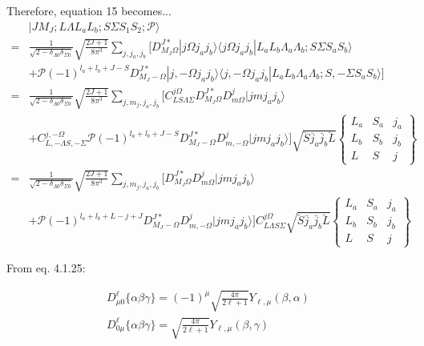 \documentclass[prl, longbibliography]{revtex4-2}
\begin{document}
Therefore, equation 15 becomes...
\begin{equation}
\begin{split}
&|J M_J; L \Lambda L_a L_b; S \Sigma  S_1 S_2; \mathcal{P} \rangle
\\
=&\frac{1}{\sqrt{2-\delta_{\Lambda 0}\delta_{\Sigma 0}}}
\sqrt{\frac{2J+1}{8\pi^3}}
\sum_{j, j_a, j_b} 
\bigg[D^{J*}_{M_J\Omega}
|j\Omega j_a j_b\rangle\langle j\Omega j_a j_b | L_a L_b \Lambda_a \Lambda_b; S\Sigma S_a S_b\rangle
\\
&+\mathcal{P}(-1)^{l_a+l_b+J-S}D^{J*}_{M_J-\Omega}
|j,-\Omega j_a j_b\rangle\langle j,-\Omega j_a j_b | L_a L_b \Lambda_a \Lambda_b; S,-\Sigma S_a S_b\rangle
\bigg]
\\
=&\frac{1}{\sqrt{2-\delta_{\Lambda 0}\delta_{\Sigma 0}}}
\sqrt{\frac{2J+1}{8\pi^3}}
\sum_{j, m_j, j_a, j_b} \bigg[
C_{L S \Lambda \Sigma}^{j \Omega}
D^{J*}_{M_J\Omega}D^j_{m \Omega}
|j m j_a j_b\rangle
\\
&+
C_{L,-\Lambda S,-\Sigma}^{j,-\Omega}
\mathcal{P}(-1)^{l_a+l_b+J-S}D^{J*}_{M_J-\Omega}
D^j_{m,-\Omega}|j m j_a j_b\rangle \bigg]
\sqrt{\breve{S}\breve{j_a}\breve{j_b}\breve{L}}
\begin{Bmatrix}
L_a & S_a & j_a\\
L_b & S_b & j_b\\
L & S & j
\end{Bmatrix}
\\
=&\frac{1}{\sqrt{2-\delta_{\Lambda 0}\delta_{\Sigma 0}}}
\sqrt{\frac{2J+1}{8\pi^3}}
\sum_{j, m_j, j_a, j_b} \bigg[
D^{J*}_{M_J\Omega}D^j_{m \Omega}
|j m j_a j_b\rangle
\\
&+
\mathcal{P}(-1)^{l_a+l_b+L-j+J}D^{J*}_{M_J-\Omega}
D^j_{m,-\Omega}|j m j_a j_b\rangle \bigg]
C_{L\Lambda S\Sigma}^{j\Omega}\sqrt{\breve{S}\breve{j_a}\breve{j_b}\breve{L}}
\begin{Bmatrix}
L_a & S_a & j_a\\
L_b & S_b & j_b\\
L & S & j
\end{Bmatrix}
\end{split}
\end{equation}

From \cite{edmonds_angular_1960}  eq. 4.1.25:

\begin{equation}
\begin{split}
D^{\ell}_{\mu 0}\{\alpha\beta\gamma\} = (-1)^\mu \sqrt{\frac{4\pi}{2\ell+1}}Y_{\ell,\mu}(\beta,\alpha)\\
D^{\ell}_{0\mu}\{\alpha\beta\gamma\} = \sqrt{\frac{4\pi}{2\ell+1}}Y_{\ell,\mu}(\beta,\gamma)
\end{split}
\end{equation}
\end{document}
